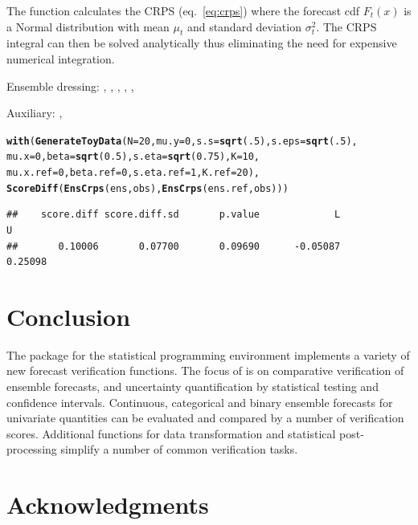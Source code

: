 \documentclass[article]{jss}\usepackage{graphicx, color}
\makeatletter
\newcommand{\hlfunctioncall}[1]{\textcolor[rgb]{0,0.501960784313725,0.752941176470588}{\textbf{#1}}}%
\newenvironment{kframe}{%
 \def\at@end@of@kframe{}%
 \ifinner\ifhmode%
  \def\at@end@of@kframe{\end{minipage}}%
  \begin{minipage}{\columnwidth}%
 \fi\fi%
 \def\FrameCommand##1{\hskip\@totalleftmargin \hskip-\fboxsep
 \colorbox{shadecolor}{##1}\hskip-\fboxsep
     \hskip-\linewidth \hskip-\@totalleftmargin \hskip\columnwidth}%
 \MakeFramed {\advance\hsize-\width
   \@totalleftmargin\z@ \linewidth\hsize
   \@setminipage}}%
 {\par\unskip\endMakeFramed%
 \at@end@of@kframe}
\newenvironment{knitrout}{}{} %
\makeatother
\begin{document}
The function  calculates the CRPS (eq.~\ref{eq:crps}) where the forecast cdf $F_t(x)$ is a Normal distribution with mean $\mu_t$ and standard deviation $\sigma^2_t$.
The CRPS integral can then be solved analytically \citep{gneiting2005calibrated} thus eliminating the need for expensive numerical integration.


Ensemble dressing: , , , , , 

Auxiliary: , 

\begin{knitrout}
\color{fgcolor}\begin{kframe}
\begin{alltt}
\hlfunctioncall{with}(\hlfunctioncall{GenerateToyData}(N=20, mu.y=0, s.s=\hlfunctioncall{sqrt}(.5), s.eps=\hlfunctioncall{sqrt}(.5), 
                     mu.x=0, beta=\hlfunctioncall{sqrt}(0.5), s.eta=\hlfunctioncall{sqrt}(0.75), K=10, 
                     mu.x.ref=0, beta.ref=0, s.eta.ref=1, K.ref=20), 
     \hlfunctioncall{ScoreDiff}(\hlfunctioncall{EnsCrps}(ens, obs), \hlfunctioncall{EnsCrps}(ens.ref, obs)))
\end{alltt}
\begin{verbatim}
##    score.diff score.diff.sd       p.value             L             U 
##       0.10006       0.07700       0.09690      -0.05087       0.25098
\end{verbatim}
\end{kframe}
\end{knitrout}






\section{Conclusion}

The package  for the  statistical programming environment implements a variety of new forecast verification functions.
The focus of  is on comparative verification of ensemble forecasts, and uncertainty quantification by statistical testing and confidence intervals.
Continuous, categorical and binary ensemble forecasts for univariate quantities can be evaluated and compared by a number of verification scores.
Additional functions for data transformation and statistical post-processing simplify a number of common verification tasks.


\section*{Acknowledgments}



\end{document}
